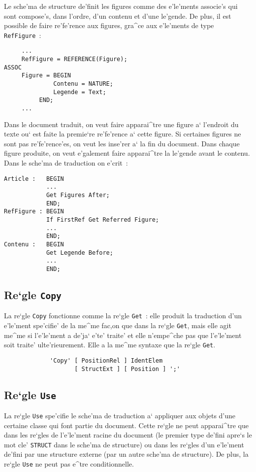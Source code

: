 {\begin{example}
Le sche'ma de structure de'finit les figures comme des e'le'ments associe's qui
sont compose's, dans l'ordre, d'un contenu et d'une le'gende. De plus, il est
possible de faire re'fe'rence aux figures, gra^ce aux e'le'ments de type
{\tt RefFigure}~:
\begin{verbatim}
     ...
     RefFigure = REFERENCE(Figure);
ASSOC
     Figure = BEGIN
              Contenu = NATURE;
              Legende = Text;
	      END;
     ...
\end{verbatim}
Dans le document traduit, on veut faire apparai^tre une figure a` l'endroit
du texte ou` est faite la premie`re re'fe'rence a` cette figure. Si certaines
figures ne sont pas re'fe'rence'es, on veut les inse'rer a` la fin du document.
Dans chaque figure produite, on veut e'galement faire apparai^tre la le'gende
avant le contenu. Dans le sche'ma de traduction on e'crit~:
\begin{verbatim}
Article :   BEGIN
            ...
            Get Figures After;
            END;
RefFigure : BEGIN
            If FirstRef Get Referred Figure;
            ...
            END;
Contenu :   BEGIN
            Get Legende Before;
            ...
            END;
\end{verbatim}
\end{example}

\subsection{Re`gle {\tt Copy}}

La re`gle {\tt Copy} fonctionne comme la re`gle {\tt Get}~: elle produit
la traduction d'un e'le'ment spe'cifie' de la me^me fac,on que dans la
re`gle {\tt Get}, mais elle agit me^me si l'e'le'ment a de'ja` e'te'
traite' et elle n'empe^che pas que l'e'le'ment soit traite' ulte'rieurement.
Elle a la me^me syntaxe que la re`gle {\tt Get}.

\begin{verbatim}
             'Copy' [ PositionRel ] IdentElem 
                    [ StructExt ] [ Position ] ';'
\end{verbatim}

\subsection{Re`gle {\tt Use}}

La re`gle {\tt Use} spe'cifie le sche'ma de traduction a` appliquer aux objets
d'une certaine classe qui font partie du document. Cette re`gle ne peut
apparai^tre que dans les re`gles de l'e'le'ment racine du document (le premier
type de'fini apre`s le mot cle' {\tt STRUCT} dans le sche'ma de structure) ou dans
les re`gles d'un e'le'ment de'fini par une structure externe (par un autre
sche'ma de structure). De plus, la re`gle {\tt Use} ne peut pas e^tre
conditionnelle.

}

